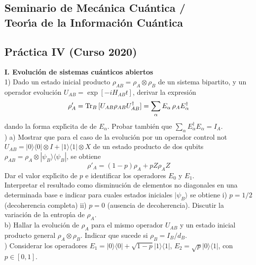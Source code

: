\documentclass[12pt]{article}
\begin{document}
\begin{center}
\subsection*{Seminario de Mec\'anica Cu\'antica / \\Teor\'{\i}a de la Informaci\'on Cu\'antica}
\subsection*{Pr\'actica IV (Curso 2020)}
\end{center}
{\bf I. Evoluci\'on de sistemas cu\'anticos abiertos}\\
1) Dado un estado inicial producto $\rho_{AB}=\rho_A\otimes\rho_B$ de un sistema bipartito, %
y  un operador evoluci\'on
$U_{AB} = \exp[-iH_{AB}t]$, derivar la expresi\'on
\[\rho'_A={\rm Tr}_B\,[U_{AB}\rho_{AB}U_{AB}^\dagger]=\sum_{\alpha} E_\alpha\, \rho_A E_\alpha^\dagger\]
dando la forma expl\'{\i}cita de de $E_\alpha$. Probar tambi\'en que $\sum_{\alpha} E_\alpha^\dagger E_\alpha=I_A$.\\ \hfill{}) a) Mostrar que para el caso de la evoluci\'on por un operador control not \\
$U_{AB} = |0\rangle\langle 0|\otimes I +|1\rangle\langle 1|\otimes X$  de un estado producto de dos qubits $\rho_{AB}=\rho_{A}\otimes |\psi_{B}\rangle\langle\psi_B|$, %
se obtiene 
\[\rho'_A=(1-p)\rho_A+pZ\rho_A Z\]
Dar el valor expl\'{\i}cito de $p$ e identificar los operadores $E_0$ y $E_1$. \\
Interpretar el resultado como disminuci\'on de elementos no diagonales en una determinada base  e indicar para cuales
estados iniciales $|\psi_B\rangle$ se obtiene i) $p = 1/2$ (decoherencia completa) ii) $p = 0$ (ausencia de decoherencia). Discutir la variaci\'on de la entrop\'{\i}a de $\rho_A$. \\
b) Hallar la evoluci\'on de $\rho_A$ para el mismo operador $U_{AB}$ y un estado
inicial producto general %
$\rho_A\otimes \rho_B$. 
Indicar que sucede si $\rho_B=I_B/d_B$. \\\hfill{}) Considerar los operadores 
$E_1=|0\rangle\langle 0|+\sqrt{1-p}|1\rangle\langle 1|$, 
$E_2=\sqrt{p}|0\rangle\langle 1|$, con $p\in[0,1]$. \\
\end{document}
